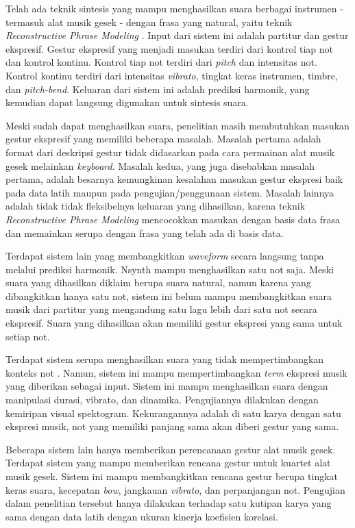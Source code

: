 Telah ada teknik sintesis yang mampu menghasilkan suara berbagai instrumen - termasuk alat musik gesek - dengan frasa yang natural, yaitu teknik \textit{Reconstructive Phrase Modeling} \parencite{lindemann2007rpm}. Input dari sistem ini adalah partitur dan gestur ekspresif. Gestur ekspresif yang menjadi masukan terdiri dari kontrol tiap not dan kontrol kontinu. Kontrol tiap not terdiri dari \textit{pitch} dan intensitas not. Kontrol kontinu terdiri dari intensitas \textit{vibrato}, tingkat keras instrumen, timbre, dan \textit{pitch-bend}. Keluaran dari sistem ini adalah prediksi harmonik, yang kemudian dapat langsung digunakan untuk sintesis suara.

Meski sudah dapat menghasilkan suara, penelitian \citet{lindemann2007rpm} masih membutuhkan masukan gestur ekspresif yang memiliki beberapa  masalah. Masalah pertama adalah format dari deskripsi gestur tidak didasarkan pada cara permainan alat musik gesek melainkan \textit{keyboard}. Masalah kedua, yang juga disebabkan masalah pertama, adalah besarnya kemungkinan kesalahan masukan gestur ekspresi baik pada data latih maupun pada pengujian/penggunaan sistem. Masalah lainnya adalah tidak tidak fleksibelnya keluaran yang dihasilkan, karena teknik \textit{Reconstructive Phrase Modeling} mencocokkan masukan dengan basis data frasa dan memainkan serupa dengan frasa yang telah ada di basis data.

Terdapat sistem lain yang membangkitkan \textit{waveform} secara langsung tanpa melalui prediksi harmonik. Nsynth \parencite{nsynth2017} mampu menghasilkan satu not saja. Meski suara yang dihasilkan diklaim berupa suara natural, namun karena yang dibangkitkan hanya satu not, sistem ini belum mampu membangkitkan suara musik dari partitur yang mengandung satu lagu lebih dari satu not secara ekspresif. Suara yang dihasilkan akan memiliki gestur ekspresi yang sama untuk setiap not.

Terdapat sistem serupa menghasilkan suara yang tidak mempertimbangkan konteks not \parencite{yang2016synthesis}. Namun, sistem ini mampu mempertimbangkan \textit{term} ekspresi musik yang diberikan sebagai input. Sistem ini mampu menghasilkan suara dengan manipulasi durasi, vibrato, dan dinamika. Pengujiannya dilakukan dengan kemiripan visual spektogram. Kekurangannya adalah di satu karya dengan satu ekspresi musik, not yang memiliki panjang sama akan diberi gestur yang sama.

Beberapa sistem lain hanya memberikan perencanaan gestur alat musik gesek. Terdapat sistem yang mampu memberikan rencana gestur untuk kuartet alat musik gesek. \parencite{marchini2014quartet} Sistem ini mampu membangkitkan rencana gestur berupa tingkat keras suara, kecepatan \textit{bow}, jangkauan \textit{vibrato}, dan perpanjangan not. Pengujian dalam penelitian tersebut hanya dilakukan terhadap satu kutipan karya yang sama dengan data latih dengan ukuran kinerja koefisien korelasi.

